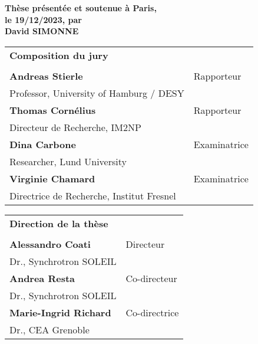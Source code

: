 \begin{titlepage}
\textbf{Thèse présentée et soutenue à Paris,\\ le 19/12/2023, par}\\
\bigskip
\Large {\color{Prune} \textbf{David SIMONNE}}

\vspace{\fill} %

\bigskip
\flushleft
\scriptsize
\begin{tabular}{|p{7cm}l}
\arrayrulecolor{Prune}
{\footnotesize \textbf{Composition du jury}}\\
& \\
\textbf{Andreas Stierle} & Rapporteur \\
Professor, University of Hamburg / DESY & \\
\textbf{Thomas Cornélius} & Rapporteur \\
Directeur de Recherche, IM2NP & \\
\textbf{Dina Carbone} & Examinatrice \\
Researcher, Lund University & \\
\textbf{Virginie Chamard} & Examinatrice \\
Directrice de Recherche, Institut Fresnel & \\

\end{tabular} 

\medskip
\begin{tabular}{|p{7cm}l}
\arrayrulecolor{Prune}
{\footnotesize \textbf{Direction de la thèse}}\\
& \\
\textbf{Alessandro Coati} & Directeur \\
Dr., Synchrotron SOLEIL & \\
\textbf{Andrea Resta} & Co-directeur \\
Dr., Synchrotron SOLEIL & \\
\textbf{Marie-Ingrid Richard} & Co-directrice \\
Dr., CEA Grenoble & \\

\end{tabular} 

\end{titlepage}